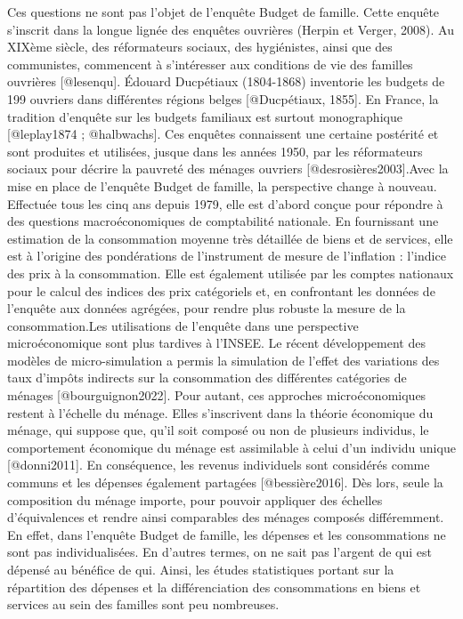 \documentclass[
  12pt,
]{book}
\begin{document}
Ces questions ne sont pas l'objet de l'enquête Budget de famille. Cette
enquête s'inscrit dans la longue lignée des enquêtes ouvrières (Herpin
et Verger, 2008). Au XIXème siècle, des réformateurs sociaux, des
hygiénistes, ainsi que des communistes, commencent à s'intéresser aux
conditions de vie des familles ouvrières {[}@lesenqu{]}. Édouard
Ducpétiaux (1804-1868) inventorie les budgets de 199 ouvriers dans
différentes régions belges {[}@Ducpétiaux, 1855{]}. En France, la
tradition d'enquête sur les budgets familiaux est surtout monographique
{[}@leplay1874 ; @halbwachs{]}. Ces enquêtes connaissent une certaine
postérité et sont produites et utilisées, jusque dans les années 1950,
par les réformateurs sociaux pour décrire la pauvreté des ménages
ouvriers {[}@desrosières2003{]}.Avec la mise en place de l'enquête
Budget de famille, la perspective change à nouveau. Effectuée tous les
cinq ans depuis 1979, elle est d'abord conçue pour répondre à des
questions macroéconomiques de comptabilité nationale. En fournissant une
estimation de la consommation moyenne très détaillée de biens et de
services, elle est à l'origine des pondérations de l'instrument de
mesure de l'inflation : l'indice des prix à la consommation. Elle est
également utilisée par les comptes nationaux pour le calcul des indices
des prix catégoriels et, en confrontant les données de l'enquête aux
données agrégées, pour rendre plus robuste la mesure de la
consommation.Les utilisations de l'enquête dans une perspective
microéconomique sont plus tardives à l'INSEE. Le récent développement
des modèles de micro-simulation a permis la simulation de l'effet des
variations des taux d'impôts indirects sur la consommation des
différentes catégories de ménages {[}@bourguignon2022{]}. Pour autant,
ces approches microéconomiques restent à l'échelle du ménage. Elles
s'inscrivent dans la théorie économique du ménage, qui suppose que,
qu'il soit composé ou non de plusieurs individus, le comportement
économique du ménage est assimilable à celui d'un individu unique
{[}@donni2011{]}. En conséquence, les revenus individuels sont
considérés comme communs et les dépenses également partagées
{[}@bessière2016{]}. Dès lors, seule la composition du ménage importe,
pour pouvoir appliquer des échelles d'équivalences et rendre ainsi
comparables des ménages composés différemment. En effet, dans l'enquête
Budget de famille, les dépenses et les consommations ne sont pas
individualisées. En d'autres termes, on ne sait pas l'argent de qui est
dépensé au bénéfice de qui. Ainsi, les études statistiques portant sur
la répartition des dépenses et la différenciation des consommations en
biens et services au sein des familles sont peu nombreuses.
\end{document}
